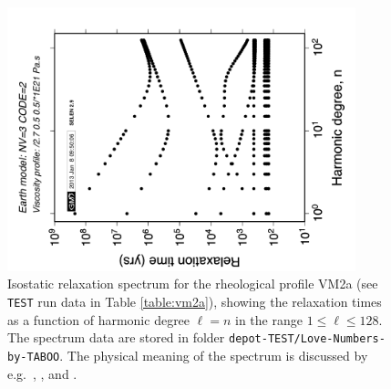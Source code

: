 \documentclass[11pt,fleqn,a4paper,titlepage]{article}
\begin{document}
\begin{figure}[h]
\begin{center}
\vspace{1.2cm}
\includegraphics[width=0.90\textwidth, angle=-90]{./Figures/spectrum.png}
\caption[Relaxation spectrum]{\small{Isostatic relaxation spectrum for the rheological profile VM2a (see 
\texttt{TEST} run data in Table \ref{table:vm2a}), showing the relaxation times as a function of harmonic degree $\ell = n$ in the range $1\le \ell \le 128$. The spectrum data are stored in folder \texttt{depot-TEST/Love-Numbers-by-TABOO}. The physical meaning of the spectrum is discussed by e.g.~\citet{Peltier_1974}, \citet{Spada-2003a}, and \citet{Spada_etal_2011}}.}
\label{fig:spectrum}
\end{center}
\end{figure}
\newpage
\end{document}

